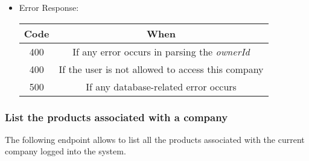 \begin{itemize}
    \item Error Response:
    \begin{table}[!h]
    \centering
    \begin{tabular}{|c|c|}
    \hline
    \multicolumn{1}{|c|}{\textbf{Code}} & \multicolumn{1}{c|}{\textbf{When}} \\ \hline
    400 & If any error occurs in parsing the \textit{ownerId}  \\\hline
    400 & If the user is not allowed to access this company \\\hline
    500 & If any database-related error occurs \\\hline
    \end{tabular}
    \end{table}

\end{itemize}


\newpage
\subsubsection*{List the products associated with a company}

The following endpoint allows to list all the products associated with the current company logged into the system.

